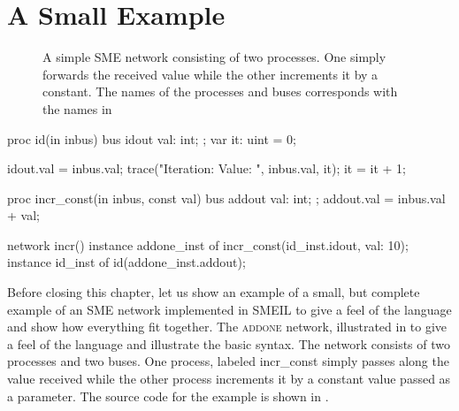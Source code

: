 \section{A Small Example}
\label{sec:smeilex}
\begin{figure}
  \centering
    \caption{A simple SME network consisting of two processes. One simply
      forwards the received value while the other increments it by a
      constant. The names of the processes and buses corresponds with the names
      in }
  \label{fig:addone}
\end{figure}
\begin{widefigure}
\begin{smeilcode2}
proc id(in inbus)
  bus idout {
    val: int;
  };
  var it: uint = 0;
{
  idout.val = inbus.val;
  trace("Iteration: {} Value: {}",
    inbus.val, it);
  it = it + 1;

}



proc incr_const(in inbus, const val)
  bus addout {
     val: int;
  };
{
  addout.val = inbus.val + val;
}

network incr() {
  instance addone_inst of
    incr_const(id_inst.idout, val: 10);
  instance id_inst of
    id(addone_inst.addout);
}
\end{smeilcode2}
\caption{An example program written in SMEIL.}
\label{fig:addone.sme}
\end{widefigure}

Before closing this chapter, let us show an example of a small, but complete
example of an SME network implemented in SMEIL to give a feel of the language
and show how everything fit together. The \textsc{addone} network, illustrated
in  to give a feel of the language and illustrate the basic
syntax. The network consists of two processes and two buses. One process,
labeled {\ttfamily incr_const} simply passes along the value received while the
other process increments it by a constant value passed as a parameter. The
source code for the example is shown in .

